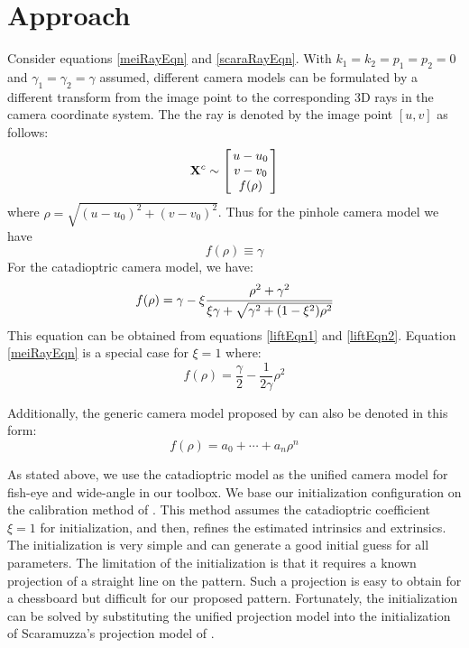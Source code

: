 \documentclass{report}
\begin{document}
\section{Approach}

Consider equations \ref{meiRayEqn} and \ref{scaraRayEqn}. With $k_1 = k_2 = p_1 = p_2 = 0$ and $\gamma_1 = \gamma_2 = \gamma$ assumed, different camera models can be formulated by a different transform from the image point to the corresponding 3D rays in the camera coordinate system. The the ray is denoted by the image point $[u, v]$ as follows: 
\begin{equation}
\mathbf{X}^c \sim 
\arraycolsep=1.5pt%
\begin{bmatrix}
	\begin{array}{c}
	u - u_0 \\ v - v_0 \\ f(\rho)
	\end{array}
\end{bmatrix}
\label{unifiedRayEqn}
\end{equation}
where $\rho = \sqrt{(u - u_0)^2 + (v - v_0)^2}$. Thus for the pinhole camera model we have
\begin{equation}
f(\rho) \equiv \gamma
\end{equation}
For the catadioptric camera model, we have: 
\begin{equation}
f(\rho) = \gamma - \xi \cfrac{\rho^2 + \gamma^2}{\xi \gamma + \sqrt{\gamma^2 + (1 - \xi^2)\rho^2}}
\label{cataEqn}
\end{equation}
This equation can be obtained from equations \ref{liftEqn1} and \ref{liftEqn2}. Equation \ref{meiRayEqn} is a special case for $\xi = 1$ where: 
\begin{equation}
f(\rho) = \frac{\gamma}{2} - \frac{1}{2 \gamma} \rho^2
\label{parabolaEqn}
\end{equation}

Additionally, the generic camera model proposed by \cite{scaramuzza2006toolbox} can also be denoted in this form: 
\begin{equation}
f(\rho) = a_0 + \cdots + a_n \rho^n
\label{polynEqn}
\end{equation}

As stated above, we use the catadioptric model as the unified camera model for fish-eye and wide-angle in our toolbox. We base our initialization configuration on the calibration method of \cite{mei2007single}. This method assumes the catadioptric coefficient $\xi = 1$ for initialization, and then, refines the estimated intrinsics and extrinsics. The initialization is very simple and can generate a good initial guess for all parameters. The limitation of the initialization is that it requires a known projection of a straight line on the pattern. Such a projection is easy to obtain for a chessboard but difficult for our proposed pattern. Fortunately, the initialization can be solved by substituting the unified projection model into the initialization of Scaramuzza's projection model of \cite{scaramuzza2006toolbox}.
\end{document}
